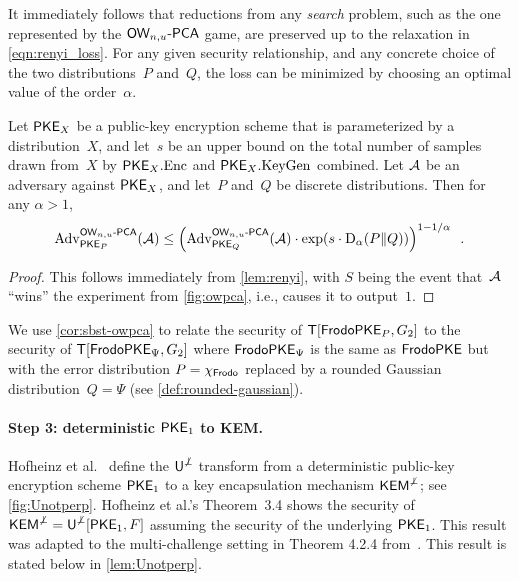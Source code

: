 It immediately follows that reductions from any \emph{search} problem,
such as the one represented by the $\textsf{\upshape\mdseries OW}_{n,u}\text{-}\textsf{\upshape\mdseries PCA}$ game, are preserved up to
the relaxation in \eqref{eqn:renyi_loss}. For any given security
relationship, and any concrete choice of the two distributions~$P$
and~$Q$, the loss can be minimized by choosing an optimal value of the
order~$\alpha$.

\begin{corollary}
  \label{cor:sbst-owpca}
  Let $\textsf{\upshape\mdseries PKE}_X$ be a public-key encryption scheme that is parameterized
  by a distribution~$X$, and let~$s$ be an upper bound on the total
  number of samples drawn from~$X$ by $\textsf{\upshape\mdseries PKE}_X.\textrm{\upshape\mdseries Enc}$ and
  $\textsf{\upshape\mdseries PKE}_X.\textrm{\upshape\mdseries KeyGen}$ combined. Let $\mathcal{A}$ be an \OWPCA adversary
  against $\textsf{\upshape\mdseries PKE}_X$, and let~$P$ and~$Q$ be discrete
  distributions. Then for any $\alpha > 1$,
  \[
    \mathrm{Adv}^{\textsf{\upshape\mdseries \ensuremath{\textsf{\upshape\mdseries OW}_{n,u}\text{-}\textsf{\upshape\mdseries PCA}}}}_{\textsf{\upshape\mdseries PKE}_P}(\mathcal{A}) \leq
    \left( \mathrm{Adv}^{\textsf{\upshape\mdseries \ensuremath{\textsf{\upshape\mdseries OW}_{n,u}\text{-}\textsf{\upshape\mdseries PCA}}}}_{\textsf{\upshape\mdseries PKE}_Q}(\mathcal{A})\cdot
      \exp(s \cdot \mathrm{D}_\alpha(P \| Q)) \right)^{1-1/\alpha} \enspace .
  \]
\end{corollary}

\begin{proof}
  This follows immediately from \autoref{lem:renyi}, with $S$ being
  the event that~$\mathcal{A}$ ``wins'' the \OWPCA experiment from
  \autoref{fig:owpca}, i.e., causes it to output~$1$.
\end{proof}

We use \autoref{cor:sbst-owpca} to relate the \OWPCA security of
$\textsf{\upshape\mdseries T}[\textsf{\upshape\mdseries FrodoPKE}_{P},G_{2}]$ to the \OWPCA security of
$\textsf{\upshape\mdseries T}[\textsf{\upshape\mdseries FrodoPKE}_\Psi,G_{2}]$ where $\textsf{\upshape\mdseries FrodoPKE}_\Psi$ is the same as
$\textsf{\upshape\mdseries FrodoPKE}$ but with the error distribution $P=\chi_{\textsf{\upshape\mdseries Frodo}}$ replaced
by a rounded Gaussian distribution~$Q=\Psi$
(see \autoref{def:rounded-gaussian}).

\paragraph{Step 3: \MOWPCA deterministic $\textsf{\upshape\mdseries PKE}_1$ to \MINDCCA KEM.}
Hofheinz et al.~\cite{TCC:HofHovKil17} define the $\textsf{\upshape\mdseries U}^{\not\perp}$ transform from a deterministic public-key
encryption scheme $\textsf{\upshape\mdseries PKE}_1$ to a key encapsulation mechanism
$\textsf{\upshape\mdseries KEM}^{\not\perp}$; see \autoref{fig:Unotperp}. Hofheinz et al.'s Theorem~3.4 shows
the \INDCCA security of $\textsf{\upshape\mdseries KEM}^{\not\perp} = \textsf{\upshape\mdseries U}^{\not\perp}[\textsf{\upshape\mdseries PKE}_1,F]$ assuming
the \OWPCA security of the underlying $\textsf{\upshape\mdseries PKE}_1$. This result was adapted to the multi-challenge setting in Theorem 4.2.4 from~\cite{GlabushThesis}.
This result is stated below in \autoref{lem:Unotperp}. 

